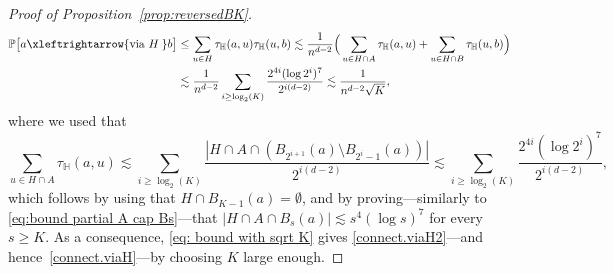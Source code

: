 \documentclass[11pt,a4paper]{article}
\numberwithin{equation}{section}
\theoremstyle{plain}
\theoremstyle{definition}
\newcommand{\connect}{\xleftrightarrow}
\begin{document}
\begin{proof}[Proof of Proposition~\textup{\ref{prop:reversedBK}}]
\begin{align}  \label{eq: bound with sqrt K}
\begin{split}
\mathbb P\big[ a \connect{\textrm{via } H\:}b\big]& \le \sum_{u\in H} \tau_{\mathbb H}(a,u) \tau_{\mathbb H}(u,b) \lesssim \frac 1{n^{d-2}} \Big( \sum_{u\in H\cap A} \tau_{\mathbb H}(a,u) +  \sum_{u\in H\cap B} \tau_{\mathbb H}(u,b)\Big)\\
& \lesssim \frac 1{n^{d-2}}   \sum_{i \geq \log_2(K)}\frac{2^{4i} (\log 2^i)^7}{2^{i(d-2)}} \lesssim \frac 1{n^{d-2}  \sqrt K}, 
\end{split} 
\end{align}
where we used that
\begin{equation}
	\sum_{u\in H\cap A}\tau_{\mathbb H}(a,u)\lesssim \sum_{i\geq \log_2(K)}\frac{|H\cap A\cap (B_{2^{i+1}}(a)\setminus B_{2^i-1}(a))|}{2^{i(d-2)}}\lesssim \sum_{i \geq \log_2(K)}\frac{2^{4i} (\log 2^i)^7}{2^{i(d-2)}},
\end{equation}
which follows by using that $H\cap B_{K-1}(a)=\emptyset$, and by proving---similarly to \eqref{eq:bound partial A cap Bs}---that $|H\cap A\cap B_s(a)|\lesssim s^4(\log s)^7$ for every $s\geq K$. 
As a consequence, \eqref{eq: bound with sqrt K} gives \eqref{connect.viaH2}---and hence~\eqref{connect.viaH}---by choosing $K$ large enough. 


\end{proof}
\end{document}
